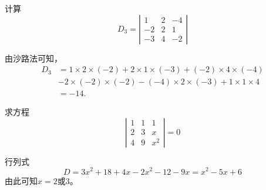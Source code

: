 \documentclass[10pt,a4paper%
tablecaptionabove]{article}
\begin{document}
\begin{CJK}{UTF8}{gkai}
  \begin{li}
    计算
    $$
    D_3 = 
    \left |
      \begin{array}{rrr}
        1  & 2 & -4 \\ 
        -2 & 2 & 1  \\
        -3 & 4 & -2
      \end{array}
    \right|
    $$
  \end{li}
  \begin{jie}
    由沙路法可知，
    $$
    \begin{array}{ll}
      D_3 &=   1\times   2  \times (-2) +   2  \times 1 \times (-3) + (-2) \times 4 \times (-4)\\[0.2cm]
          & - 2\times (-2) \times (-2) - (-4) \times 2 \times (-3) +   1  \times 1 \times   4\\[0.2cm]
          & = -14.
    \end{array}
    $$
  \end{jie}

  \begin{li}
    求方程
    $$
    \left |
      \begin{array}{ccc}
        1  & 1 & 1 \\
        2  & 3 & x  \\
        4  & 9 & x^2
      \end{array}
    \right| = 0
    $$        
  \end{li}
  \begin{jie}
    行列式
    $$ 
    D = 3x^2 + 18 + 4x - 2x^2 - 12 - 9x 
    = x^2 - 5x + 6
    $$
    由此可知$x=2$或$3$。
  \end{jie}



\end{CJK}
\end{document}
